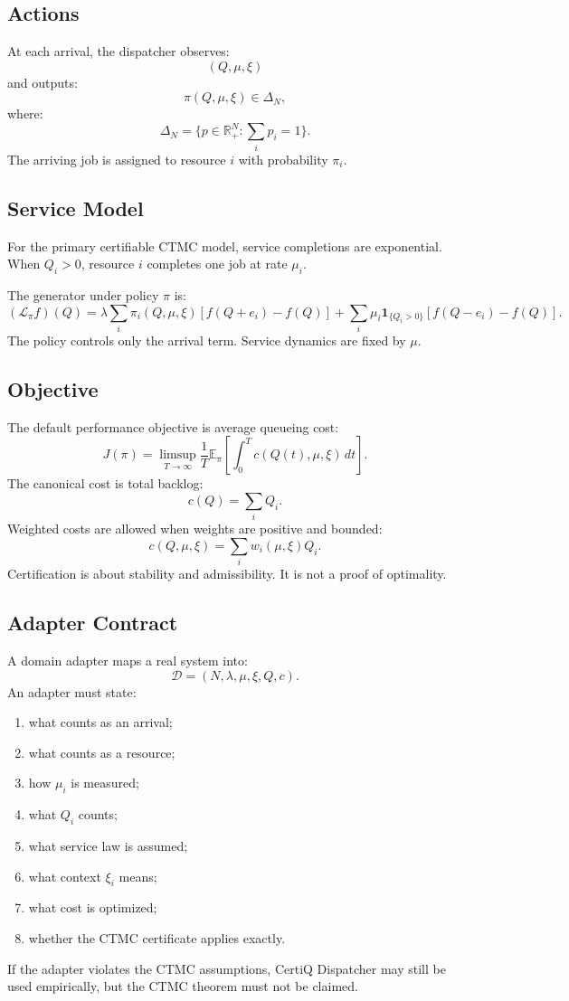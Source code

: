 \documentclass[a4paper,11pt]{article}
\theoremstyle{definition}
\begin{document}
\subsection{Actions}

At each arrival, the dispatcher observes:
\[
(Q,\mu,\xi)
\]
and outputs:
\[
\pi(Q,\mu,\xi)\in\Delta_N,
\]
where:
\[
\Delta_N=\{p\in\mathbb R_+^N:\textstyle\sum_i p_i=1\}.
\]
The arriving job is assigned to resource \(i\) with probability \(\pi_i\).

\subsection{Service Model}

For the primary certifiable CTMC model, service completions are exponential.
When \(Q_i>0\), resource \(i\) completes one job at rate \(\mu_i\).

The generator under policy \(\pi\) is:
\[
(\mathcal L_\pi f)(Q)
=
\lambda\sum_i\pi_i(Q,\mu,\xi)[f(Q+e_i)-f(Q)]
+
\sum_i\mu_i\mathbf 1_{\{Q_i>0\}}[f(Q-e_i)-f(Q)].
\]
The policy controls only the arrival term. Service dynamics are fixed by
\(\mu\).

\subsection{Objective}

The default performance objective is average queueing cost:
\[
J(\pi)
=
\limsup_{T\to\infty}
\frac1T
\mathbb E_\pi
\left[
\int_0^T c(Q(t),\mu,\xi)\,dt
\right].
\]
The canonical cost is total backlog:
\[
c(Q)=\sum_i Q_i.
\]
Weighted costs are allowed when weights are positive and bounded:
\[
c(Q,\mu,\xi)=\sum_i w_i(\mu,\xi)Q_i.
\]
Certification is about stability and admissibility. It is not a proof of
optimality.

\subsection{Adapter Contract}

A domain adapter maps a real system into:
\[
\mathcal D=(N,\lambda,\mu,\xi,Q,c).
\]
An adapter must state:
\begin{enumerate}
  \item what counts as an arrival;
  \item what counts as a resource;
  \item how \(\mu_i\) is measured;
  \item what \(Q_i\) counts;
  \item what service law is assumed;
  \item what context \(\xi_i\) means;
  \item what cost is optimized;
  \item whether the CTMC certificate applies exactly.
\end{enumerate}
If the adapter violates the CTMC assumptions, CertiQ Dispatcher may still be
used empirically, but the CTMC theorem must not be claimed.
\end{document}
